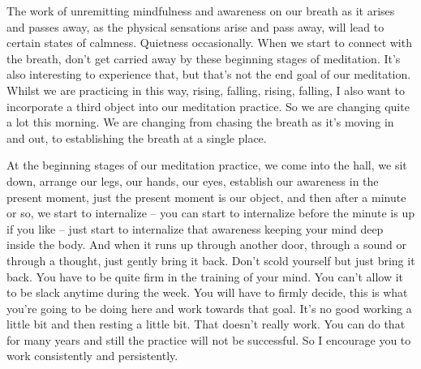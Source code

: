 \documentclass[letterpaper,10pt,english]{sphinxmanual}
\begin{document}
\sphinxAtStartPar
The work of unremitting mindfulness and awareness on our breath as it
arises and passes away, as the physical sensations arise and pass away, will
lead to certain states of calmness. Quietness occasionally. When we start to
connect  with  the  breath,  don’t  get  carried  away  by  these  beginning  stages
of meditation. It’s also interesting to experience that, but that’s not the end
goal of our meditation. Whilst we are practicing in this way, rising, falling,
rising, falling, I also want to incorporate a third object into our meditation
practice. So we are changing quite a lot this morning. We are changing from
chasing the breath as it’s moving in and out, to establishing the breath at a
single place.

\sphinxAtStartPar
At the beginning stages of our meditation practice, we come into the
hall, we sit down, arrange our legs, our hands, our eyes, establish our awareness in the present moment, just the present moment is our object, and then
after  a  minute  or  so,  we  start  to  internalize  –  you  can  start  to  internalize
before  the  minute  is  up  if  you  like  –  just  start  to  internalize  that  awareness keeping your mind deep inside the body. And when it runs up through
another door, through a sound or through a thought, just gently bring it back.
Don’t scold yourself but just bring it back. You have to be quite firm in the
training  of  your  mind.  You  can’t  allow  it  to  be  slack  anytime  during  the
week. You will have to firmly decide, this is what you’re going to be doing
here and work towards that goal. It’s no good working a little bit and then
resting a little bit. That doesn’t really work. You can do that for many years
and still the practice will not be successful. So I encourage you to work consistently and persistently.
\end{document}
